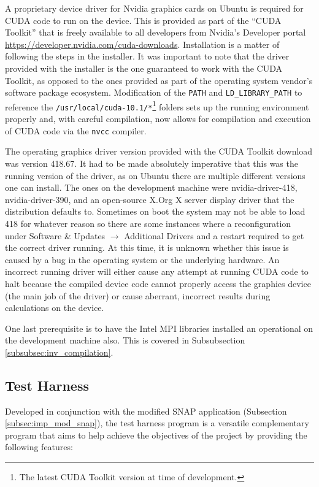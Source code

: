 \documentclass[conference]{IEEEtran}
\begin{document}
A proprietary device driver for Nvidia graphics cards on Ubuntu is required for CUDA code to run on the device. This is provided as part of the ``CUDA Toolkit'' that is freely available to all developers from Nvidia's Developer portal \url{https://developer.nvidia.com/cuda-downloads}. Installation is a matter of following the steps in the installer. It was important to note that the driver provided with the installer is the one guaranteed to work with the CUDA Toolkit, as opposed to the ones provided as part of the operating system vendor's software package ecosystem. Modification of the \texttt{PATH} and \texttt{LD\_LIBRARY\_PATH} to reference the \texttt{/usr/local/cuda-10.1/*}\footnote{The latest CUDA Toolkit version at time of development.} folders sets up the running environment properly and, with careful compilation, now allows for compilation and execution of CUDA code via the \texttt{nvcc} compiler.

The operating graphics driver version provided with the CUDA Toolkit download was version 418.67. It had to be made absolutely imperative that this was the running version of the driver, as on Ubuntu there are multiple different versions one can install. The ones on the development machine were nvidia-driver-418, nvidia-driver-390, and an open-source X.Org X server display driver that the distribution defaults to. Sometimes on boot the system may not be able to load 418 for whatever reason so there are some instances where a reconfiguration under Software \& Updates $\rightarrow$ Additional Drivers and a restart required to get the correct driver running. At this time, it is unknown whether this issue is caused by a bug in the operating system or the underlying hardware. An incorrect running driver will either cause any attempt at running CUDA code to halt because the compiled device code cannot properly access the graphics device (the main job of the driver) or cause aberrant, incorrect results during calculations on the device.

One last prerequisite is to have the Intel MPI libraries installed an operational on the development machine also. This is covered in Subsubsection \ref{subsubsec:inv_compilation}.


\subsection{Test Harness}
\label{subsec:imp_testharness}

Developed in conjunction with the modified SNAP application (Subsection \ref{subsec:imp_mod_snap}), the test harness program is a versatile complementary program that aims to help achieve the objectives of the project by providing the following features:
\end{document}
